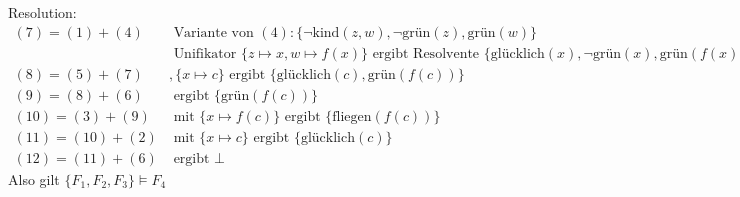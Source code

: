 \documentclass[a4paper,10pt]{article}
\begin{document}
\begin{enumerate}
Resolution: 
\begin{align*}
(7) = (1)+(4) & \text{ Variante von } (4): \{\neg \text{kind}(z,w), \neg\text{grün}(z),\text{grün}(w)\} \\
& \text{ Unifikator } \{z \mapsto x, w \mapsto f(x)\} \text{ ergibt Resolvente } \{\text{glücklich}(x),\neg\text{grün}(x),\text{grün}(f(x))\} \\
(8) = (5)+(7) &,\{x \mapsto c\} \text{ ergibt } \{\text{glücklich}(c),\text{grün}(f(c))\} \\
(9) = (8)+(6) & \text{ ergibt } \{\text{grün}(f(c))\} \\
(10) = (3)+(9) & \text{ mit } \{x \mapsto f(c)\} \text{ ergibt } \{\text{fliegen}(f(c))\} \\
(11) = (10)+(2) & \text{ mit } \{x \mapsto c\} \text{ ergibt } \{\text{glücklich}(c)\} \\
(12) = (11)+(6) & \text{ ergibt } \bot
\end{align*}
Also gilt $\{F_1, F_2, F_3\} \models F_4$
\end{enumerate}
\end{document}
